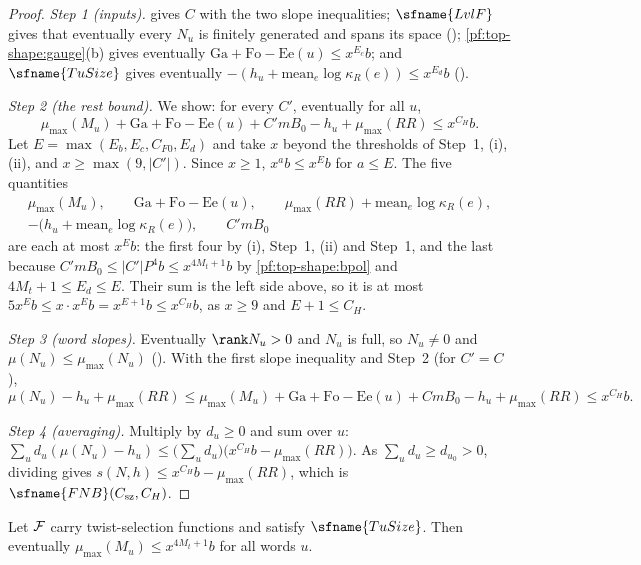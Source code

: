 \begin{proof}
\emph{Step 1 (inputs).}  gives $C$ with the two slope inequalities; $\sfname{LvlF}$
gives that eventually every $N_u$ is finitely generated and spans its space
(); \cref{pf:top-shape:gauge}(b) gives eventually
$\mathrm{Ga}+\mathrm{Fo}-\mathrm{Ee}(u)\le x^{E_c}b$; and $\sfname{TuSize}$ gives eventually
$-(h_u+\mathrm{mean}_e\log\kappa_R(e))\le x^{E_d}b$
().

\emph{Step 2 (the rest bound).} We show: for every $C'$, eventually for all $u$,
\[
\mu_{\max}(M_u)+\mathrm{Ga}+\mathrm{Fo}-\mathrm{Ee}(u)+C'mB_0-h_u+\mu_{\max}(\mathit{RR})\le x^{C_H}b .
\]
Let $E=\max(E_b,E_c,C_{F0},E_d)$ and take $x$ beyond the thresholds of Step~1, (i), (ii), and $x\ge\max(9,|C'|)$.
Since $x\ge1$, $x^{a}b\le x^Eb$ for $a\le E$. The five quantities
\begin{gather*}
\mu_{\max}(M_u),\qquad\mathrm{Ga}+\mathrm{Fo}-\mathrm{Ee}(u),\qquad\mu_{\max}(\mathit{RR})+\mathrm{mean}_e\log\kappa_R(e),\\
-\bigl(h_u+\mathrm{mean}_e\log\kappa_R(e)\bigr),\qquad C'mB_0
\end{gather*}
are each at most $x^Eb$: the first four by (i), Step~1, (ii) and Step~1, and the last because
$C'mB_0\le|C'|P^4b\le x^{4M_t+1}b$ by \cref{pf:top-shape:bpol} and $4M_t+1\le E_d\le E$. Their sum is the left side
above, so it is at most $5x^Eb\le x\cdot x^Eb=x^{E+1}b\le x^{C_H}b$, as $x\ge9$ and $E+1\le C_H$.

\emph{Step 3 (word slopes).} Eventually $\rank N_u>0$ and $N_u$ is full, so $N_u\ne0$ and
$\mu(N_u)\le\mu_{\max}(N_u)$ (). With the
first slope inequality and Step~2 (for $C'=C$),
\[
\mu(N_u)-h_u+\mu_{\max}(\mathit{RR})\le\mu_{\max}(M_u)+\mathrm{Ga}+\mathrm{Fo}-\mathrm{Ee}(u)+CmB_0-h_u+\mu_{\max}(\mathit{RR})
\le x^{C_H}b .
\]

\emph{Step 4 (averaging).} Multiply by $d_u\ge0$ and sum over $u$:
$\sum_ud_u(\mu(N_u)-h_u)\le\bigl(\sum_ud_u\bigr)\bigl(x^{C_H}b-\mu_{\max}(\mathit{RR})\bigr)$. As $\sum_ud_u\ge d_{u_0}>0$,
dividing gives $s(N,h)\le x^{C_H}b-\mu_{\max}(\mathit{RR})$, which is $\sfname{FNB}(C_{\rm sz},C_H)$.
\end{proof}

\begin{proposition}\label{pf:top-shape:boundB}
Let $\mathcal{F}$ carry twist-selection functions and satisfy $\sfname{TuSize}$. Then eventually
$\mu_{\max}(M_u)\le x^{4M_t+1}b$ for all words $u$.
\end{proposition}

